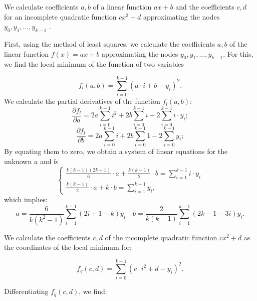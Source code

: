 We calculate coefficients \(a,b\) of a linear function \(ax+b\) and the coefficients \(c,d\) for an incomplete quadratic function \(cx^2 + d\) approximating the nodes \(y_0, y_1, \ldots , y_{k-1}\) \cite{Orekhov201809,Orekhov2018}.

First, using the method of least squares, we calculate the coefficients \(a, b\) of the linear function \(f(x) = ax + b\) approximating the nodes \(y_0, y_1, \ldots , y_{k-1}\). For this, we find the local minimum of the
function of two variables

\begin{equation}
	\label{eqn:34}
	f_l (a, b) = \sum_{i=0}^{k-1}(a \cdot i + b - y_i)^2.
\end{equation} We calculate the partial derivatives of the function \(f_l (a, b)\):
\begin{equation}
	\label{eqn:35}
	\frac{\partial f_l}{\partial a} = 2a \sum_{i=0}^{k-1} i^2 + 2b \sum_{i=0}^{k-1}i - 2\sum_{i=0}^{k-1}i \cdot y_i;
\end{equation}
\begin{equation}
	\label{eqn:36}
	\frac{\partial f_l}{\partial b} = 2a \sum_{i=0}^{k-1} i + 2b \sum_{i=0}^{k-1}1 - 2\sum_{i=0}^{k-1} y_i;
\end{equation} By equating them to zero, we obtain a system of linear equations for the unknown \(a\) and \(b\):
\begin{equation}
	\label{eqn:37}
	\begin{cases}
		\frac{k(k-1)(2k-1)}{6} \cdot a + \frac{k(k-1)}{2} \cdot b = \sum_{i=1}^{k-1} i \cdot y_i \\
		\frac{k(k-1)}{2} \cdot a + k \cdot b = \sum_{i=1}^{k-1} y_i,
	\end{cases}
\end{equation} which implies:
\begin{equation}
	\label{eqn:38}
	a = \frac{6}{k(k^2 - 1)} {\sum_{i=1}^{k-1}(2i + 1 - k)y_i} \quad b = \frac{2}{k(k-1)} \sum_{i=1}^{k-1}(2k-1 - 3i)y_i.
\end{equation}

We calculate the coefficients \(c, d\) of the incomplete quadratic function \(cx^2 + d\) as the coordinates of
the local minimum for:

\begin{equation}
\label{eqn:39}
f_q(c, d) = \sum_{i=0}^{k-1} (c \cdot i^2 + d - y_i)^2.
\end{equation}


Differentiating \(f_q(c, d)\), we find:

